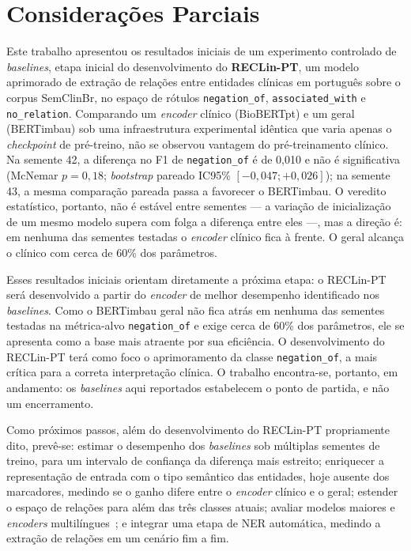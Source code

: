 \documentclass[12pt]{article}
\begin{document}
\section{Considerações Parciais}\label{sec:conc}

Este trabalho apresentou os resultados iniciais de um experimento controlado de
\emph{baselines}, etapa inicial do desenvolvimento do \textbf{RECLin-PT}, um
modelo aprimorado de extração de relações entre entidades clínicas em português
sobre o corpus SemClinBr, no espaço de rótulos \texttt{negation\_of},
\texttt{associated\_with} e \texttt{no\_relation}. Comparando um \emph{encoder}
clínico (BioBERTpt) e um geral (BERTimbau) sob uma infraestrutura experimental
idêntica que varia apenas o \emph{checkpoint} de pré-treino, não se observou
vantagem do pré-treinamento clínico. Na semente 42, a diferença no F1 de
\texttt{negation\_of} é de 0,010 e não é significativa (McNemar $p=0,18$;
\emph{bootstrap} pareado IC95\% $[-0,047;+0,026]$); na semente 43, a mesma
comparação pareada passa a favorecer o BERTimbau. O veredito estatístico,
portanto, não é estável entre sementes --- a variação de inicialização de um mesmo
modelo supera com folga a diferença entre eles ---, mas a direção é: em nenhuma
das sementes testadas o \emph{encoder} clínico fica à frente. O geral alcança o
clínico com cerca de 60\% dos parâmetros.

Esses resultados iniciais orientam diretamente a próxima etapa: o RECLin-PT será
desenvolvido a partir do \emph{encoder} de melhor desempenho identificado nos
\emph{baselines}. Como o BERTimbau geral não fica atrás em nenhuma das sementes
testadas na métrica-alvo \texttt{negation\_of} e exige cerca de 60\% dos
parâmetros, ele se apresenta como a base mais atraente por sua eficiência. O
desenvolvimento do RECLin-PT terá como foco o aprimoramento da classe
\texttt{negation\_of}, a mais crítica para a correta interpretação clínica. O
trabalho encontra-se, portanto, em andamento: os \emph{baselines} aqui reportados
estabelecem o ponto de partida, e não um encerramento.

Como próximos passos, além do desenvolvimento do RECLin-PT propriamente dito,
prevê-se: estimar o desempenho dos \emph{baselines} sob múltiplas sementes de
treino, para um intervalo de confiança da diferença mais estreito; enriquecer a
representação de entrada com o tipo semântico das entidades, hoje ausente dos
marcadores, medindo se o ganho difere entre o \emph{encoder} clínico e o geral;
estender o
espaço de relações para além das três classes atuais; avaliar modelos maiores e
\emph{encoders} multilíngues~\cite{conneau:20}; e integrar uma etapa de NER
automática, medindo a extração de relações em um cenário fim a fim.



\end{document}
